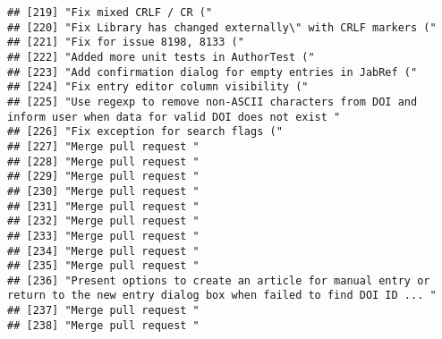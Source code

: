 \documentclass[
]{article}
\begin{document}
\begin{verbatim}
## [219] "Fix mixed CRLF / CR ("                                                                                                      
## [220] "Fix Library has changed externally\" with CRLF markers ("                                                                   
## [221] "Fix for issue 8198, 8133 ("                                                                                                 
## [222] "Added more unit tests in AuthorTest ("                                                                                      
## [223] "Add confirmation dialog for empty entries in JabRef ("                                                                      
## [224] "Fix entry editor column visibility ("                                                                                       
## [225] "Use regexp to remove non-ASCII characters from DOI and inform user when data for valid DOI does not exist "                 
## [226] "Fix exception for search flags ("                                                                                           
## [227] "Merge pull request "                                                                                                        
## [228] "Merge pull request "                                                                                                        
## [229] "Merge pull request "                                                                                                        
## [230] "Merge pull request "                                                                                                        
## [231] "Merge pull request "                                                                                                        
## [232] "Merge pull request "                                                                                                        
## [233] "Merge pull request "                                                                                                        
## [234] "Merge pull request "                                                                                                        
## [235] "Merge pull request "                                                                                                        
## [236] "Present options to create an article for manual entry or return to the new entry dialog box when failed to find DOI ID ... "
## [237] "Merge pull request "                                                                                                        
## [238] "Merge pull request "                                                                                                        

\end{verbatim}
\end{document}
